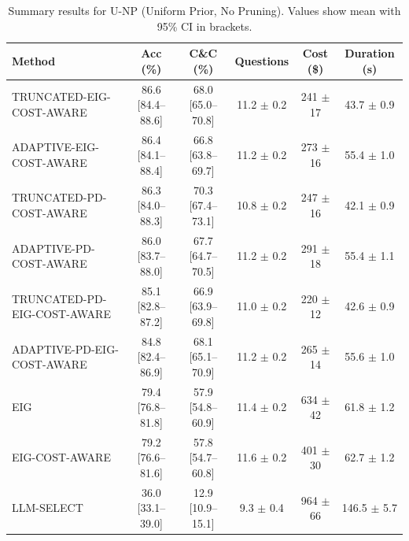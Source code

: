 \begin{table}[htbp]
\centering
\small
\caption{Summary results for U-NP (Uniform Prior, No Pruning). Values show mean with 95\% CI in brackets.}
\label{tab:results-notprune_uniform}
\begin{tabular}{@{}lccccc@{}}
\toprule
Method & Acc (\%) & C\&C (\%) & Questions & Cost (\$) & Duration (s) \\
\midrule
TRUNCATED-EIG-COST-AWARE & 86.6 [84.4--88.6] & 68.0 [65.0--70.8] & 11.2 $\pm$ 0.2 & 241 $\pm$ 17 & 43.7 $\pm$ 0.9 \\
ADAPTIVE-EIG-COST-AWARE & 86.4 [84.1--88.4] & 66.8 [63.8--69.7] & 11.2 $\pm$ 0.2 & 273 $\pm$ 16 & 55.4 $\pm$ 1.0 \\
TRUNCATED-PD-COST-AWARE & 86.3 [84.0--88.3] & 70.3 [67.4--73.1] & 10.8 $\pm$ 0.2 & 247 $\pm$ 16 & 42.1 $\pm$ 0.9 \\
ADAPTIVE-PD-COST-AWARE & 86.0 [83.7--88.0] & 67.7 [64.7--70.5] & 11.2 $\pm$ 0.2 & 291 $\pm$ 18 & 55.4 $\pm$ 1.1 \\
TRUNCATED-PD-EIG-COST-AWARE & 85.1 [82.8--87.2] & 66.9 [63.9--69.8] & 11.0 $\pm$ 0.2 & 220 $\pm$ 12 & 42.6 $\pm$ 0.9 \\
ADAPTIVE-PD-EIG-COST-AWARE & 84.8 [82.4--86.9] & 68.1 [65.1--70.9] & 11.2 $\pm$ 0.2 & 265 $\pm$ 14 & 55.6 $\pm$ 1.0 \\
EIG & 79.4 [76.8--81.8] & 57.9 [54.8--60.9] & 11.4 $\pm$ 0.2 & 634 $\pm$ 42 & 61.8 $\pm$ 1.2 \\
EIG-COST-AWARE & 79.2 [76.6--81.6] & 57.8 [54.7--60.8] & 11.6 $\pm$ 0.2 & 401 $\pm$ 30 & 62.7 $\pm$ 1.2 \\
LLM-SELECT & 36.0 [33.1--39.0] & 12.9 [10.9--15.1] & 9.3 $\pm$ 0.4 & 964 $\pm$ 66 & 146.5 $\pm$ 5.7 \\
\bottomrule
\end{tabular}
\end{table}